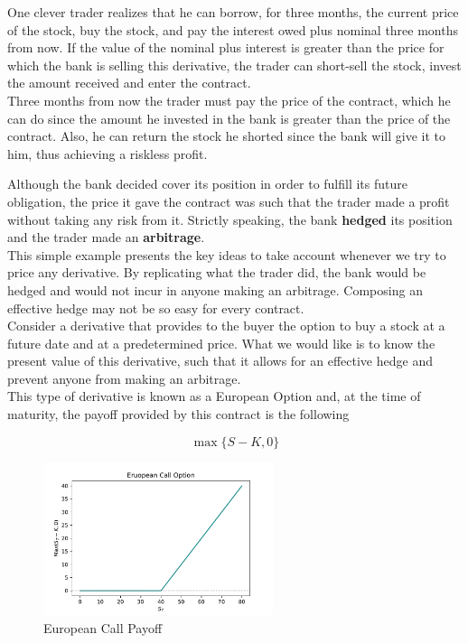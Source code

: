 \documentclass[../TGMAFFIRO]{subfiles}
\begin{document}
 One clever trader realizes that he can borrow, for three months, the current price of the stock, buy the stock, and pay the interest owed plus nominal three months from now. If the value of the nominal plus interest is greater than the price for which the bank is selling this derivative, the trader can short-sell the stock, invest the amount received and enter the contract.\\
 
  Three months from now the trader must pay the price of the contract, which he can do since the amount he invested in the bank is greater than the price of the contract. Also, he can return the stock he shorted since the bank will give it to him, thus achieving a riskless profit.

Although the bank decided cover its position in order to fulfill its future obligation, the price it gave the contract was such that the trader made a profit without taking any risk from it. Strictly speaking, the bank \textbf{hedged} its position and the trader made an \textbf{arbitrage}.\\

This simple example presents the key ideas to take account whenever we try to price any derivative. By replicating what the trader did, the bank would be hedged and would not incur in anyone making an arbitrage. Composing an effective hedge may not be so easy for every contract.\\

Consider a derivative that provides to the buyer the option to buy a stock at a future date and at a predetermined price. What we would like is to know the present value of this derivative, such that it allows for an effective hedge and prevent anyone from making an arbitrage.\\

This type of derivative is known as a European Option and, at the time of maturity, the payoff provided by this contract is the following

\begin{equation}
	\max\{S-K, 0\}
\end{equation}


\begin{figure}[h]
	\centering
	\label{fig:call_option_payoff}
	\includegraphics[width=0.6\textwidth]{images/Call.pdf}	
	\caption{European Call Payoff}
\end{figure}
\end{document}
